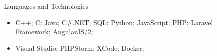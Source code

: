 \documentclass{mcdowellcv}
\begin{document}
	\begin{cvsection}{Languages and Technologies}
		\begin{cvsubsection}{}{}{}	
			\begin{itemize}
				\item C++; C; Java;  C\#.NET; SQL; Python; JavaScript; PHP; Laravel Framework; AngularJS/2;  
				\item Visual Studio; PHPStorm; XCode; Docker;
			\end{itemize}
		\end{cvsubsection}
	\end{cvsection}
	
\end{document}
